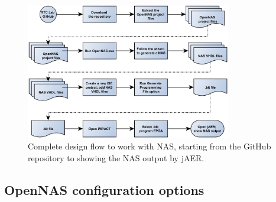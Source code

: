 \begin{figure}[H]
\centering
\includegraphics[width=0.8\textwidth]{NAS_design_flow.jpg}
\caption{\label{fig:nas_designflow}Complete design flow to work with NAS, starting from the GitHub repository to showing the NAS output by jAER.}
\end{figure}

\subsection{OpenNAS configuration options}




